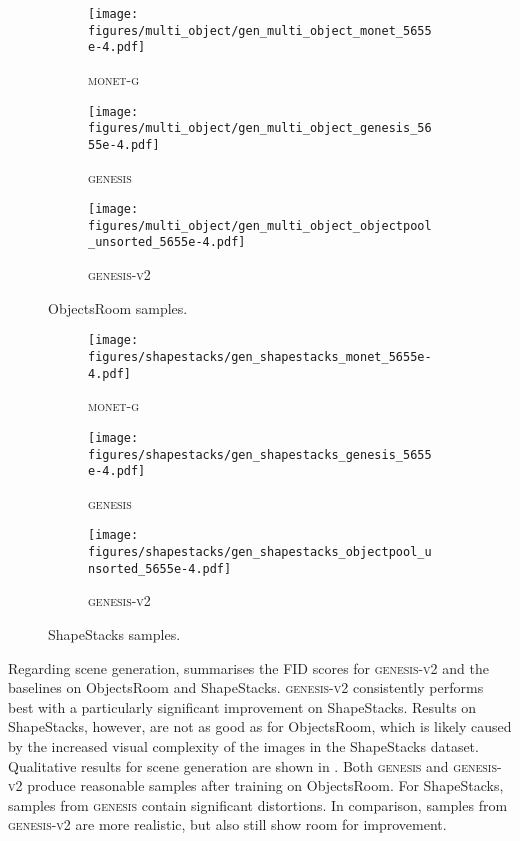 \documentclass{article}
\begin{document}
\begin{figure}
    \centering
    \parbox{0.45\linewidth}{
    \begin{subfigure}{\linewidth}
		\texttt{[image: figures/multi\_object/gen\_multi\_object\_monet\_5655e-4.pdf]}
		\caption{\textsc{monet-g}}
		\vspace{6pt}
	\end{subfigure}
    \begin{subfigure}{\linewidth}
		\texttt{[image: figures/multi\_object/gen\_multi\_object\_genesis\_5655e-4.pdf]}
		\caption{\textsc{genesis}}
		\vspace{6pt}
	\end{subfigure}
	\begin{subfigure}{\linewidth}
		\texttt{[image: figures/multi\_object/gen\_multi\_object\_objectpool\_unsorted\_5655e-4.pdf]}
		\caption{\textsc{genesis-v2}}
	\end{subfigure}
	\caption{ObjectsRoom samples.}
	\label{fig:objectsroom_samples}
	}
	\qquad
	\parbox{0.45\linewidth}{
	\begin{subfigure}{\linewidth}
		\texttt{[image: figures/shapestacks/gen\_shapestacks\_monet\_5655e-4.pdf]}
		\caption{\textsc{monet-g}}
		\vspace{6pt}
	\end{subfigure}
	\begin{subfigure}{\linewidth}
		\texttt{[image: figures/shapestacks/gen\_shapestacks\_genesis\_5655e-4.pdf]}
		\caption{\textsc{genesis}}
		\vspace{6pt}
	\end{subfigure}
	\begin{subfigure}{\linewidth}
		\texttt{[image: figures/shapestacks/gen\_shapestacks\_objectpool\_unsorted\_5655e-4.pdf]}
		\caption{\textsc{genesis-v2}}
	\end{subfigure}
	\caption{ShapeStacks samples.}
	\label{fig:shapestacks_samples}
	}
\end{figure}

Regarding scene generation,  summarises the FID scores for \textsc{genesis-v2} and the baselines on ObjectsRoom and ShapeStacks.
\textsc{genesis-v2} consistently performs best with a particularly significant improvement on ShapeStacks.
Results on ShapeStacks, however, are not as good as for ObjectsRoom, which is likely caused by the increased visual complexity of the images in the ShapeStacks dataset.
Qualitative results for scene generation are shown in .
Both \textsc{genesis} and \textsc{genesis-v2} produce reasonable samples after training on ObjectsRoom.
For ShapeStacks, samples from \textsc{genesis} contain significant distortions.
In comparison, samples from \textsc{genesis-v2} are more realistic, but also still show room for improvement.
\end{document}
